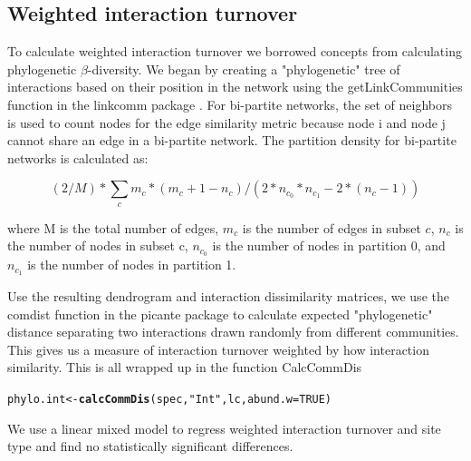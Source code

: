 \documentclass{article}\usepackage[]{graphicx}\usepackage[]{color}
\makeatletter
\newcommand{\hlnum}[1]{\textcolor[rgb]{0.686,0.059,0.569}{#1}}%
\newcommand{\hlstr}[1]{\textcolor[rgb]{0.192,0.494,0.8}{#1}}%
\newcommand{\hlstd}[1]{\textcolor[rgb]{0.345,0.345,0.345}{#1}}%
\newcommand{\hlkwb}[1]{\textcolor[rgb]{0.69,0.353,0.396}{#1}}%
\newcommand{\hlkwc}[1]{\textcolor[rgb]{0.333,0.667,0.333}{#1}}%
\newcommand{\hlkwd}[1]{\textcolor[rgb]{0.737,0.353,0.396}{\textbf{#1}}}%
\newenvironment{kframe}{%
 \def\at@end@of@kframe{}%
 \ifinner\ifhmode%
  \def\at@end@of@kframe{\end{minipage}}%
  \begin{minipage}{\columnwidth}%
 \fi\fi%
 \def\FrameCommand##1{\hskip\@totalleftmargin \hskip-\fboxsep
 \colorbox{shadecolor}{##1}\hskip-\fboxsep
     \hskip-\linewidth \hskip-\@totalleftmargin \hskip\columnwidth}%
 \MakeFramed {\advance\hsize-\width
   \@totalleftmargin\z@ \linewidth\hsize
   \@setminipage}}%
 {\par\unskip\endMakeFramed%
 \at@end@of@kframe}
\newenvironment{knitrout}{}{} %
\makeatother
\begin{document}
\subsection{Weighted interaction turnover}



To calculate weighted interaction turnover we borrowed concepts from
calculating phylogenetic $\beta$-diversity. We began by creating a
"phylogenetic" tree of interactions based on their position in the
network using the getLinkCommunities function in the linkcomm package
\citep{kalinka2011linkcomm}. For bi-partite networks, the set of
neighbors is used to count nodes for the edge similarity metric
because node i and node j cannot share an edge in a bi-partite
network. The partition density for bi-partite networks is calculated
as:


\begin{equation}
 (2/M)*\sum_c m_c*(m_c + 1-n_c)/(2*n_{c_0}*n_{c_1} - 2*(n_c - 1))
\end{equation}

where M is the total number of edges, $m_c$ is the number of edges in
subset $c$, $n_c$ is the number of nodes in subset c, $n_{c_0}$ is the
number of nodes in partition 0, and $n_{c_1}$ is the number of nodes
in partition 1.

Use the resulting dendrogram and interaction dissimilarity matrices,
we use the comdist function in the picante package
\citep{picante-2010-1463} to calculate expected "phylogenetic"
distance separating two interactions drawn randomly from different
communities. This gives us a measure of interaction turnover weighted
by how interaction similarity. This is all wrapped up in the function
CalcCommDis

\begin{knitrout}
\color{fgcolor}\begin{kframe}
\begin{alltt}
\hlstd{phylo.int} \hlkwb{<-} \hlkwd{calcCommDis}\hlstd{(spec,} \hlstr{"Int"}\hlstd{, lc,} \hlkwc{abund.w}\hlstd{=}\hlnum{TRUE}\hlstd{)}
\end{alltt}
\end{kframe}
\end{knitrout}

We use a linear mixed model to regress weighted interaction turnover
and site type and find no statistically significant differences.
\end{document}
